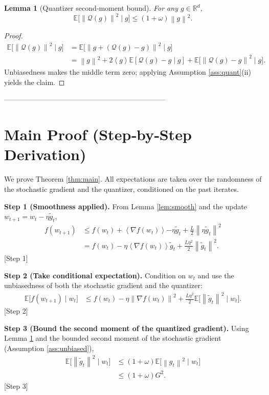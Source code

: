 \documentclass{article}
\newtheorem{lemma}{Lemma}
\newcommand{\E}{\mathbb{E}}
\newcommand{\norm}[1]{\left\|#1\right\|}
\newcommand{\inner}[1]{\left\langle #1\right\rangle}
\newcommand{\Q}{\mathcal{Q}}
\begin{document}
\begin{lemma}[Quantizer second‑moment bound]\label{lem:quant}
For any $g\in\mathbb{R}^d$,
\[
\E\big[\norm{\Q(g)}^2\mid g\big]\le (1+\omega)\norm{g}^2 .
\]
\end{lemma}
\begin{proof}
\[
\begin{aligned}
\E\!\big[\norm{\Q(g)}^2\mid g\big]
&=\E\!\big[\norm{g+(\Q(g)-g)}^2\mid g\big] \\
&=\norm{g}^2+2\inner{g}{\E[\Q(g)-g\mid g]}+\E\!\big[\norm{\Q(g)-g}^2\mid g\big].
\end{aligned}
\]
Unbiasedness makes the middle term zero; applying Assumption \ref{ass:quant}(ii) yields the claim. \qedhere
\end{proof}

--------------------------------------------------------------------

\section*{Main Proof (Step‑by‑Step Derivation)}
We prove Theorem \ref{thm:main}. All expectations are taken over the randomness of the stochastic gradient and the quantizer, conditioned on the past iterates.

\medskip
\noindent\textbf{Step 1 (Smoothness applied).}  
From Lemma \ref{lem:smooth} and the update $w_{t+1}=w_t-\eta\tilde g_t$,
\[
\begin{aligned}
f(w_{t+1})
&\le f(w_t)+\inner{\nabla f(w_t)}{-\eta\tilde g_t}
+\frac{L}{2}\norm{\eta\tilde g_t}^2 \\
&= f(w_t)-\eta\inner{\nabla f(w_t)}{\tilde g_t}
+\frac{L\eta^2}{2}\norm{\tilde g_t}^2 .
\tag{2}
\end{aligned}
\] 
[Step 1]

\medskip
\noindent\textbf{Step 2 (Take conditional expectation).}  
Condition on $w_t$ and use the unbiasedness of both the stochastic gradient and the quantizer:
\[
\begin{aligned}
\E\!\big[f(w_{t+1})\mid w_t\big]
&\le f(w_t)-\eta\norm{\nabla f(w_t)}^2
+\frac{L\eta^2}{2}\E\!\big[\norm{\tilde g_t}^2\mid w_t\big] .
\end{aligned}
\tag{3}
\] 
[Step 2]

\medskip
\noindent\textbf{Step 3 (Bound the second moment of the quantized gradient).}  
Using Lemma \ref{lem:quant} and the bounded second moment of the stochastic gradient (Assumption \ref{ass:unbiased}),
\[
\begin{aligned}
\E\!\big[\norm{\tilde g_t}^2\mid w_t\big]
&\le (1+\omega)\E\!\big[\norm{g_t}^2\mid w_t\big] \\
&\le (1+\omega)G^2 .
\end{aligned}
\tag{4}
\] 
[Step 3]
\end{document}
